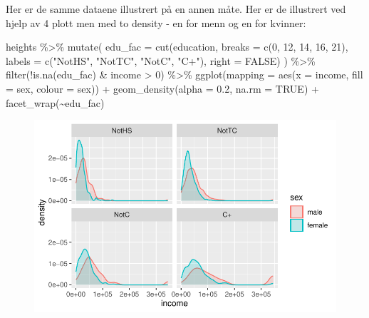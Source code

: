 \documentclass[
  letterpaper,
  DIV=11,
  numbers=noendperiod]{scrartcl}
\newenvironment{Shaded}{\begin{snugshade}}{\end{snugshade}}
\newcommand{\AttributeTok}[1]{\textcolor[rgb]{0.40,0.45,0.13}{#1}}
\newcommand{\ConstantTok}[1]{\textcolor[rgb]{0.56,0.35,0.01}{#1}}
\newcommand{\DecValTok}[1]{\textcolor[rgb]{0.68,0.00,0.00}{#1}}
\newcommand{\FloatTok}[1]{\textcolor[rgb]{0.68,0.00,0.00}{#1}}
\newcommand{\FunctionTok}[1]{\textcolor[rgb]{0.28,0.35,0.67}{#1}}
\newcommand{\NormalTok}[1]{\textcolor[rgb]{0.00,0.23,0.31}{#1}}
\newcommand{\SpecialCharTok}[1]{\textcolor[rgb]{0.37,0.37,0.37}{#1}}
\newcommand{\StringTok}[1]{\textcolor[rgb]{0.13,0.47,0.30}{#1}}
\begin{document}
Her er de samme dataene illustrert på en annen måte. Her er de
illustrert ved hjelp av 4 plott men med to density - en for menn og en
for kvinner:

\begin{Shaded}
\begin{Highlighting}[]
\NormalTok{heights }\SpecialCharTok{\%\textgreater{}\%} 
  \FunctionTok{mutate}\NormalTok{(}
    \AttributeTok{edu\_fac =} \FunctionTok{cut}\NormalTok{(education, }
                  \AttributeTok{breaks =} \FunctionTok{c}\NormalTok{(}\DecValTok{0}\NormalTok{, }\DecValTok{12}\NormalTok{, }\DecValTok{14}\NormalTok{, }\DecValTok{16}\NormalTok{, }\DecValTok{21}\NormalTok{), }
                  \AttributeTok{labels =} \FunctionTok{c}\NormalTok{(}\StringTok{"NotHS"}\NormalTok{, }\StringTok{"NotTC"}\NormalTok{, }\StringTok{"NotC"}\NormalTok{, }\StringTok{"C+"}\NormalTok{),}
                  \AttributeTok{right =} \ConstantTok{FALSE}\NormalTok{) }
\NormalTok{  ) }\SpecialCharTok{\%\textgreater{}\%} 
  \FunctionTok{filter}\NormalTok{(}\SpecialCharTok{!}\FunctionTok{is.na}\NormalTok{(edu\_fac) }\SpecialCharTok{\&}\NormalTok{ income }\SpecialCharTok{\textgreater{}} \DecValTok{0}\NormalTok{) }\SpecialCharTok{\%\textgreater{}\%}
  \FunctionTok{ggplot}\NormalTok{(}\AttributeTok{mapping =} \FunctionTok{aes}\NormalTok{(}\AttributeTok{x =}\NormalTok{ income, }\AttributeTok{fill =}\NormalTok{ sex, }\AttributeTok{colour =}\NormalTok{ sex)) }\SpecialCharTok{+}
  \FunctionTok{geom\_density}\NormalTok{(}\AttributeTok{alpha =} \FloatTok{0.2}\NormalTok{, }\AttributeTok{na.rm =} \ConstantTok{TRUE}\NormalTok{) }\SpecialCharTok{+} 
  \FunctionTok{facet\_wrap}\NormalTok{(}\SpecialCharTok{\textasciitilde{}}\NormalTok{edu\_fac)}
\end{Highlighting}
\end{Shaded}

\begin{figure}[H]

{\centering \includegraphics{EDA_files/figure-pdf/unnamed-chunk-20-1.pdf}

}

\end{figure}
\end{document}
